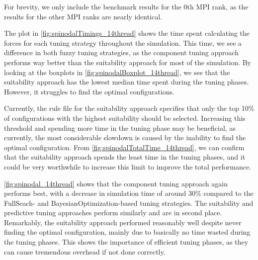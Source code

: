 For brevity, we only include the benchmark results for the 0th MPI rank, as the results for the other MPI ranks are nearly identical.

The plot in \autoref{fig:spinodalTimings_14thread} shows the time spent calculating the forces for each tuning strategy throughout the simulation. This time, we see a difference in both fuzzy tuning strategies, as the component tuning approach performs way better than the suitability approach for most of the simulation. By looking at the boxplots in \autoref{fig:spinodalBoxplot_14thread}, we see that the suitability approach has the lowest median time spent during the tuning phases. However, it struggles to find the optimal configurations.

Currently, the rule file for the suitability approach specifies that only the top 10\% of configurations with the highest suitability should be selected. Increasing this threshold and spending more time in the tuning phase may be beneficial, as currently, the most considerable slowdown is caused by the inability to find the optimal configuration. From \autoref{fig:spinodalTotalTime_14thread}, we can confirm that the suitability approach spends the least time in the tuning phases, and it could be very worthwhile to increase this limit to improve the total performance.

\autoref{fig:spinodal_14thread} shows that the component tuning approach again performs best, with a decrease in simulation time of around 30\% compared to the FullSeach- and BayesianOptimization-based tuning strategies. The suitability and predictive tuning approaches perform similarly and are in second place. Remarkably, the suitability approach performed reasonably well despite never finding the optimal configuration, mainly due to basically no time wasted during the tuning phases. This shows the importance of efficient tuning phases, as they can cause tremendous overhead if not done correctly.

\newpage



